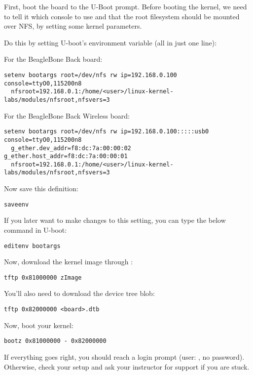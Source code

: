 First, boot the board to the U-Boot prompt. Before booting the kernel,
we need to tell it which console to use and that the root filesystem
should be mounted over NFS, by setting some kernel parameters.

Do this by setting U-boot's  environment variable (all in
just one line):

For the BeagleBone Back board:
\begin{verbatim}
setenv bootargs root=/dev/nfs rw ip=192.168.0.100 console=ttyO0,115200n8
  nfsroot=192.168.0.1:/home/<user>/linux-kernel-labs/modules/nfsroot,nfsvers=3
\end{verbatim}

For the BeagleBone Back Wireless board:
\begin{verbatim}
setenv bootargs root=/dev/nfs rw ip=192.168.0.100:::::usb0 console=ttyO0,115200n8
  g_ether.dev_addr=f8:dc:7a:00:00:02 g_ether.host_addr=f8:dc:7a:00:00:01
  nfsroot=192.168.0.1:/home/<user>/linux-kernel-labs/modules/nfsroot,nfsvers=3
\end{verbatim}

Now save this definition:
\begin{verbatim}
saveenv
\end{verbatim}

If you later want to make changes to this setting, you can type the
below command in U-boot:

\begin{verbatim}
editenv bootargs
\end{verbatim}

Now, download the kernel image through :

\begin{verbatim}
tftp 0x81000000 zImage
\end{verbatim}

You'll also need to download the device tree blob:

\begin{verbatim}
tftp 0x82000000 <board>.dtb
\end{verbatim}

Now, boot your kernel:

\begin{verbatim}
bootz 0x81000000 - 0x82000000
\end{verbatim}

If everything goes right, you should reach a login prompt (user:
, no password). Otherwise, check your setup and
ask your instructor for support if you are stuck.

